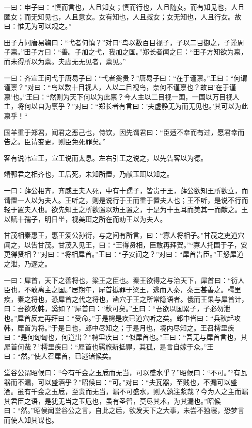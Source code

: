 \documentclass[]{article}
\begin{document}
一曰：申子曰：``慎而言也，人且知女；慎而行也，人且随女。而有知见也，人且匿女；而无知见也，人且意女。女有知也，人且臧女；女无知也，人且行女。故曰：惟无为可以规之。''

田子方问唐易鞠曰：``弋者何慎？''对曰``鸟以数百目视子，子以二目御之，子谨周子禀。''田子方曰：``善。子加之弋，我加之国。''郑长者闻之曰：``田子方知欲为禀，而未得所以为禀。夫虚无无见者，禀见。''

一曰：齐宣王问弋于唐易子曰：``弋者奚贵？''唐易子曰：``在于谨禀。''王曰：``何谓谨禀？''对曰：``鸟以数十目视人，人以二目视鸟，奈何不谨禀也？故曰'在于谨禀'也。''王曰：``然则为天下何以为此禀？今人主以二目视一国，一国以万目视人主，将何以自为禀乎？''对曰：``郑长者有言曰：'夫虚静无为而无见也。'其可以为此禀乎！``

国羊重于郑君，闻君之恶己也，侍饮，因先谓君曰：``臣适不幸而有过，愿君幸而告之。臣请变更，则臣免死罪矣。''

客有说韩宣王，宣王说而太息。左右引王之说之，以先告客以为德。

靖郭君之相齐也，王后死，未知所置，乃献玉珥以知之。

一曰：薛公相齐，齐威王夫人死，中有十孺子，皆贵于王，薛公欲知王所欲立，而请置一人以为夫人。王听之，则是说行于王而重于置夫人也；王不听，是说不行而轻于置夫人也。欲先知王之所欲置以劝王置之，于是为十玉耳而美其一而献之。王以赋十孺子，明日坐，视美珥之所在而劝王以为夫人。

甘茂相秦惠王，惠王爱公孙衍，与之间有所言，曰：``寡人将相子。''甘茂之吏道穴闻之，以告甘茂。甘茂入见王，曰：``王得贤相，臣敢再拜贺。''``寡人托国于子，安更得贤相？''对曰：``将相犀首。''王曰：``子安闻之？''对曰：``犀首告臣。''王怒犀道之泄，乃逐之。

一曰：犀首，天下之善将也，梁王之臣也。秦王欲得之与治天下，犀首曰：``衍人臣也，不敢离主之国。''居期年，犀首抵罪于梁王，逃而入秦，秦王甚善之。樗里疾，秦之将也，恐犀首之代之将也，凿穴于王之所常隐语者。俄而王果与犀首计，曰：吾欲攻韩，奚如？''犀首曰：``秋可矣。''王曰：``吾欲以国累子，子必勿泄也。''犀首反走再拜曰：``受命。''于是樗是疾已道穴听之矣。郎中皆曰：``兵秋起攻韩，犀首为将。''于是日也，郎中尽知之；于是月也，境内尽知之。王召樗里疾曰：``是何匈匈也，何道出？''樗里疾曰：``似犀首也。''王曰：``吾无与犀首言也，其犀首何哉？''樗里疾曰：``犀首也羁旅新抵罪，其孤，是言自嫁于众。''王曰：``然。''使人召犀首，已逃诸候矣。

堂谷公谓昭候曰：``今有千金之玉卮而无当，可以盛水乎？''昭候曰：``不可。''``有瓦器而不漏，可以盛酒乎？''昭候曰：``可。''对曰：``夫瓦器，至贱也，不漏可以盛酒。虽有千金之玉卮，至贵而无当，漏不可盛水，则人孰注浆哉？今为人之主而漏其君臣之语，是犹无当之玉卮也，虽有圣智，莫尽其术，为其漏也。''昭候曰：``然。''昭侯闻堂谷公之言，自此之后，欲发天下之大事，未尝不独寝，恐梦言而使人知其谋也。
\end{document}
